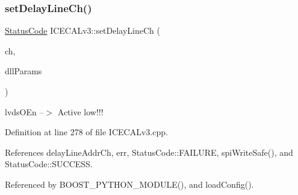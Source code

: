 \mbox{\label{classICECALv3_a14a7a29c9a3412c062f053cc616b860a}} 
\subsubsection{\texorpdfstring{set\+Delay\+Line\+Ch()}{setDelayLineCh()}}
{\footnotesize\ttfamily \hyperlink{classStatusCode}{Status\+Code} I\+C\+E\+C\+A\+Lv3\+::set\+Delay\+Line\+Ch (\begin{DoxyParamCaption}\item[{int}]{ch,  }\item[{Py\+Object $\ast$}]{dll\+Params }\end{DoxyParamCaption})}

lvds\+O\+En --$>$ Active low!!! 

Definition at line 278 of file I\+C\+E\+C\+A\+Lv3.\+cpp.



References delay\+Line\+Addr\+Ch, err, Status\+Code\+::\+F\+A\+I\+L\+U\+RE, spi\+Write\+Safe(), and Status\+Code\+::\+S\+U\+C\+C\+E\+SS.



Referenced by B\+O\+O\+S\+T\+\_\+\+P\+Y\+T\+H\+O\+N\+\_\+\+M\+O\+D\+U\+L\+E(), and load\+Config().


